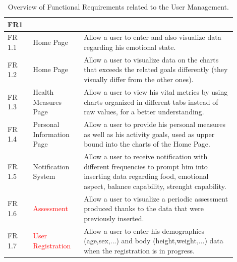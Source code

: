 \begin{table}[h!]
    \setstretch{\myspacing}
    \centering
    \begin{tabular}{|>{\raggedright\arraybackslash}p{0.1\linewidth}|>{\raggedright\arraybackslash}p{0.2\linewidth}|>{\raggedright\arraybackslash}p{0.6\linewidth}|}
        \hline
        \textbf{FR1} & \multicolumn{2}{>{\centering\arraybackslash}p{0.7\linewidth}|}{\textbf{User Management}} \\
        \hline
        FR 1.1 & Home Page & Allow a user to enter and also visualize data regarding his emotional state. \\
        \hline
        FR 1.2 & Home Page & Allow a user to visualize data on the charts that exceeds the related goals differently (they visually differ from the other ones). \\
        \hline
        FR 1.3 & Health Measures Page & Allow a user to view his vital metrics by using charts organized in different tabs instead of raw values, for a better understanding. \\
        \hline
        FR 1.4 & Personal Information Page & Allow a user to provide his personal measures as well as his activity goals, used as upper bound into the charts of the Home Page. \\
        \hline
        FR 1.5 & Notification System & Allow a user to receive notification with different frequencies to prompt him into inserting data regarding food, emotional aspect, balance capability, strenght capability. \\
        \hline
        FR 1.6 & \textcolor{red}{Assessment} & Allow a user to visualize a periodic assessment produced thanks to the data that were previously inserted. \\
        \hline
        FR 1.7 & \textcolor{red}{User Registration} & Allow a user to enter his demographics (age,sex,...) and body (height,weight,...) data when the registration is in progress. \\
        \hline
    \end{tabular}
    \caption{Overview of Functional Requirements related to the User Management.}
\end{table}

\newpage

